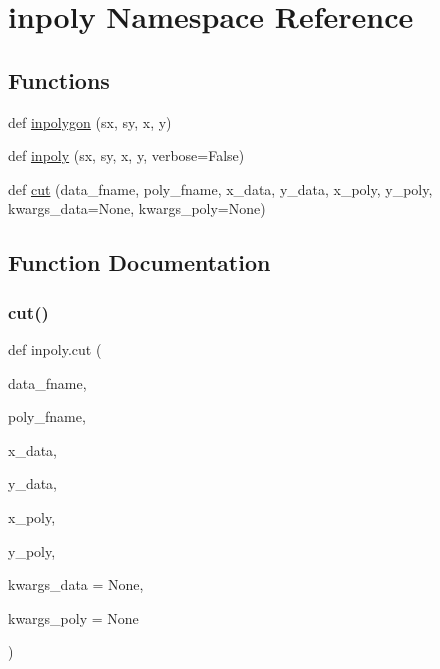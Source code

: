 \hypertarget{namespaceinpoly}{}\section{inpoly Namespace Reference}
\label{namespaceinpoly}
\subsection*{Functions}
\begin{DoxyCompactItemize}
\item 
def \hyperlink{namespaceinpoly_ac011fa801ecb6cc9429eaf02b25dd1e5}{inpolygon} (sx, sy, x, y)
\item 
def \hyperlink{namespaceinpoly_ad77175adc1811d9ba49b3a6f5753e336}{inpoly} (sx, sy, x, y, verbose=False)
\item 
def \hyperlink{namespaceinpoly_a6071c414de973f7a1162ae911036c02d}{cut} (data\+\_\+fname, poly\+\_\+fname, x\+\_\+data, y\+\_\+data, x\+\_\+poly, y\+\_\+poly, kwargs\+\_\+data=None, kwargs\+\_\+poly=None)
\end{DoxyCompactItemize}


\subsection{Function Documentation}
\mbox{\label{namespaceinpoly_a6071c414de973f7a1162ae911036c02d}} 
\subsubsection{\texorpdfstring{cut()}{cut()}}
{\footnotesize\ttfamily def inpoly.\+cut (\begin{DoxyParamCaption}\item[{}]{data\+\_\+fname,  }\item[{}]{poly\+\_\+fname,  }\item[{}]{x\+\_\+data,  }\item[{}]{y\+\_\+data,  }\item[{}]{x\+\_\+poly,  }\item[{}]{y\+\_\+poly,  }\item[{}]{kwargs\+\_\+data = {\ttfamily None},  }\item[{}]{kwargs\+\_\+poly = {\ttfamily None} }\end{DoxyParamCaption})}



